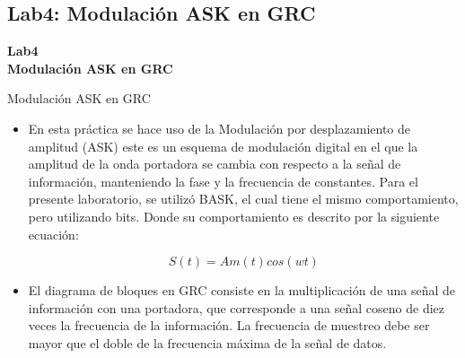 \subsection{Lab4: Modulación ASK en GRC}

\begin{frame}{}


\bfseries{\textrm{\LARGE Lab4\\ \Large Modulación ASK en GRC}}
\raggedright
\end{frame}


\begin{frame}{Modulación ASK en GRC}



  \begin{itemize}
  \item {
En esta práctica se hace uso de la  Modulación por desplazamiento de amplitud (ASK) este es un esquema de modulación digital en el que la amplitud de la onda portadora se cambia con respecto a la señal de información, manteniendo la fase y la frecuencia de constantes. Para el presente laboratorio, se utilizó BASK, el cual tiene el mismo comportamiento, pero utilizando bits. Donde su comportamiento es descrito por la siguiente ecuación:

\begin{equation*}
S(t) = Am(t)cos(wt)
\end{equation*}

  }
  \item {
El diagrama de bloques en GRC consiste en la multiplicación de una señal de información con una portadora, que corresponde a una señal coseno de diez veces la frecuencia de la información. La frecuencia de muestreo debe ser mayor que el doble de la frecuencia máxima de la señal de datos.
  }
  \end{itemize}
\end{frame}

